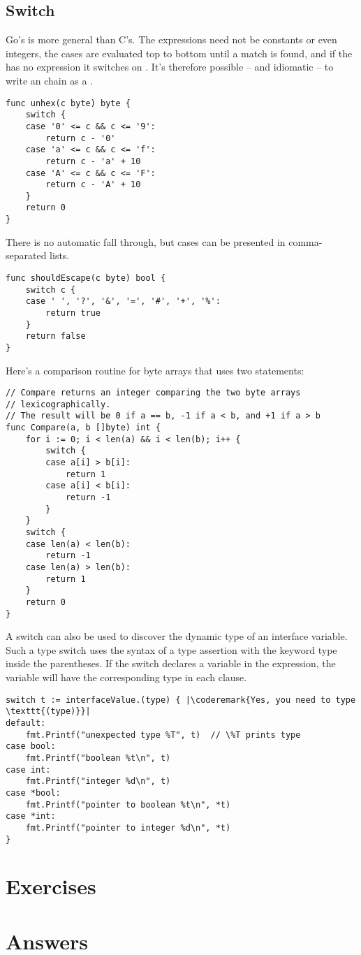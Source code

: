 \subsection{Switch}
Go's  is more general than C's. The expressions need not be
constants or even integers, the cases are evaluated top to bottom until
a match is found, and if the  has no expression it switches on
. It's therefore possible -- and idiomatic -- to write an
 chain as a .
\begin{lstlisting}
func unhex(c byte) byte {
    switch {
    case '0' <= c && c <= '9':
        return c - '0'
    case 'a' <= c && c <= 'f':
        return c - 'a' + 10
    case 'A' <= c && c <= 'F':
        return c - 'A' + 10
    }
    return 0
}
\end{lstlisting}
There is no automatic fall through, but cases can be presented in comma-separated lists.

\begin{lstlisting}
func shouldEscape(c byte) bool {
    switch c {
    case ' ', '?', '&', '=', '#', '+', '%':
        return true
    }
    return false
}
\end{lstlisting}
Here's a comparison routine for byte arrays that uses two  statements:

\begin{lstlisting}
// Compare returns an integer comparing the two byte arrays
// lexicographically.
// The result will be 0 if a == b, -1 if a < b, and +1 if a > b
func Compare(a, b []byte) int {
    for i := 0; i < len(a) && i < len(b); i++ {
        switch {
        case a[i] > b[i]:
            return 1
        case a[i] < b[i]:
            return -1
        }
    }
    switch {
    case len(a) < len(b):
        return -1
    case len(a) > len(b):
        return 1
    }
    return 0
}
\end{lstlisting}
A switch can also be used to discover the dynamic type of an interface
variable. Such a type switch uses 
the syntax of a type assertion with the keyword type inside the
parentheses. If the switch declares a variable in the expression, the
variable will have the corresponding type in each clause.

\begin{lstlisting}
switch t := interfaceValue.(type) { |\coderemark{Yes, you need to type \texttt{(type)}}|
default:
    fmt.Printf("unexpected type %T", t)  // \%T prints type
case bool:
    fmt.Printf("boolean %t\n", t)
case int:
    fmt.Printf("integer %d\n", t)
case *bool:
    fmt.Printf("pointer to boolean %t\n", *t)
case *int:
    fmt.Printf("pointer to integer %d\n", *t)
}
\end{lstlisting}

\section{Exercises}




\cleardoublepage
\section{Answers}
\shipoutAnswer

